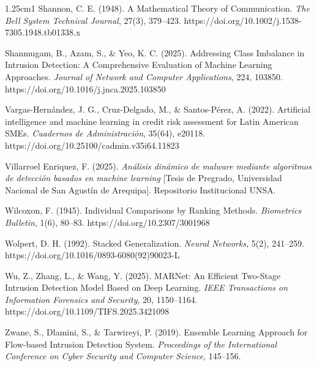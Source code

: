 \begin{hangparas}{1.25cm}{1}
Shannon, C. E. (1948). A Mathematical Theory of Communication. \textit{The Bell System Technical Journal}, 27(3), 379--423. https://doi.org/10.1002/j.1538-7305.1948.tb01338.x

Shanmugam, B., Azam, S., \& Yeo, K. C. (2025). Addressing Class Imbalance in Intrusion Detection: A Comprehensive Evaluation of Machine Learning Approaches. \textit{Journal of Network and Computer Applications}, 224, 103850. https://doi.org/10.1016/j.jnca.2025.103850

Vargas-Hernández, J. G., Cruz-Delgado, M., \& Santos-Pérez, A. (2022). Artificial intelligence and machine learning in credit risk assessment for Latin American SMEs. \textit{Cuadernos de Administración}, 35(64), e20118. https://doi.org/10.25100/cadmin.v35i64.11823

Villarroel Enriquez, F. (2025). \textit{Análisis dinámico de malware mediante algoritmos de detección basados en machine learning} [Tesis de Pregrado, Universidad Nacional de San Agustín de Arequipa]. Repositorio Institucional UNSA.

Wilcoxon, F. (1945). Individual Comparisons by Ranking Methods. \textit{Biometrics Bulletin}, 1(6), 80--83. https://doi.org/10.2307/3001968

Wolpert, D. H. (1992). Stacked Generalization. \textit{Neural Networks}, 5(2), 241--259. https://doi.org/10.1016/0893-6080(92)90023-L

Wu, Z., Zhang, L., \& Wang, Y. (2025). MARNet: An Efficient Two-Stage Intrusion Detection Model Based on Deep Learning. \textit{IEEE Transactions on Information Forensics and Security}, 20, 1150--1164. https://doi.org/10.1109/TIFS.2025.3421098

Zwane, S., Dlamini, S., \& Tarwireyi, P. (2019). Ensemble Learning Approach for Flow-based Intrusion Detection System. \textit{Proceedings of the International Conference on Cyber Security and Computer Science}, 145--156.

\end{hangparas}
